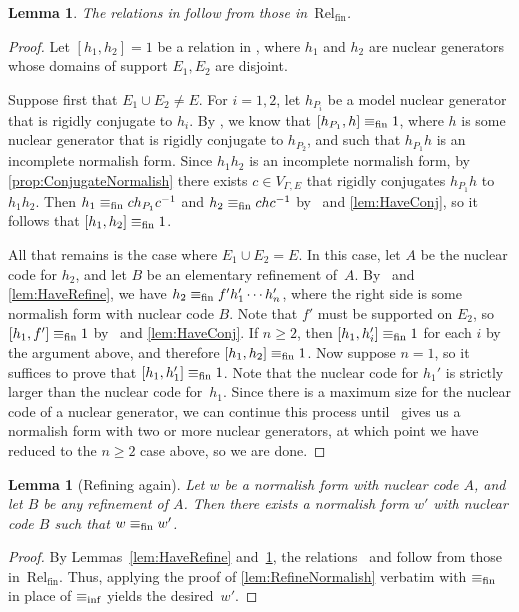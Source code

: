 \documentclass[11pt,letterpaper]{amsart}
\newtheorem{lemma}[theorem]{Lemma}
\theoremstyle{definition}
\newcommand{\Rel}{\mathrm{Rel}}
\begin{document}
\begin{lemma}\label{lem:HaveDisjComm}
The relations in\/ {\normalfont\DisjComm} follow from those in\/~$\Rel_{\mathrm{fin}}$.
\end{lemma}
\begin{proof}
Let $[h_1,h_2]=1$ be a relation in \DisjComm, where $h_1$ and $h_2$ are nuclear generators whose domains of support $E_1,E_2$ are disjoint.

Suppose first that $E_1\cup E_2\ne E$.  For $i=1,2$, let $h_{P_i}$ be a model nuclear generator that is rigidly conjugate to $h_i$.  By \DisjCommFin, we know that $[h_{P_1},h]\equiv_{\mathrm{fin}} 1$, where $h$ is some nuclear generator that is rigidly conjugate to $h_{P_2}$, and such that $h_{P_1}h$ is an incomplete normalish form.  Since $h_1h_2$ is an incomplete normalish form, by \cref{prop:ConjugateNormalish} there exists $c\in V_{\Gamma,E}$ that rigidly conjugates $h_{P_1}h$ to $h_1h_2$.  Then $h_1\equiv_{\mathrm{fin}} ch_{P_1}c^{-1}$ and $h_2\equiv_{\mathrm{fin}} chc^{-1}$ by \Conj\ and \cref{lem:HaveConj}, so it follows that $[h_1,h_2]\equiv_{\mathrm{fin}} 1$.

All that remains is the case where $E_1\cup E_2=E$.  In this case, let $A$ be the nuclear code for $h_2$, and let $B$ be an elementary refinement of~$A$. By \Refine\ and \cref{lem:HaveRefine}, we have $h_2\equiv_{\mathrm{fin}} f'h_1'\cdots h_n'$, where the right side is some normalish form with nuclear code $B$. Note that $f'$ must be supported on $E_2$, so $[h_1,f']\equiv_{\mathrm{fin}} 1$ by \Conj\ and \cref{lem:HaveConj}.  If $n\geq 2$, then $[h_1,h_i']\equiv_{\mathrm{fin}} 1$ for each $i$ by the argument above, and therefore $[h_1,h_2]\equiv_{\mathrm{fin}} 1$.  Now suppose $n=1$, so it suffices to prove that $[h_1,h_1']\equiv_{\mathrm{fin}} 1$. Note that the nuclear code for $h_1'$ is strictly larger than the nuclear code for~$h_1$. Since there is a maximum size for the nuclear code of a nuclear generator, we can continue this process until \Refine\ gives us a normalish form with two or more nuclear generators, at which point we have reduced to the $n\ge 2$ case above, so we are done.
\end{proof}

\begin{lemma}[Refining again]\label{lem:RefineNormalishAgain}
Let $w$ be a normalish form with nuclear code $A$, and let $B$ be any refinement of $A$.  Then there exists a normalish form $w'$ with nuclear code $B$ such that $w\equiv_{\mathrm{fin}} w'$.
\end{lemma}
\begin{proof}
By Lemmas~\ref{lem:HaveRefine} and~\ref{lem:HaveDisjComm}, the relations \Refine\ and \mbox{\DisjComm} follow from those in\/~$\Rel_{\mathrm{fin}}$.  Thus, applying the proof of \cref{lem:RefineNormalish} verbatim with $\equiv_{\mathrm{fin}}$ in place of $\equiv_{\mathrm{inf}}$ yields the desired~$w'$.
\end{proof}
\end{document}
